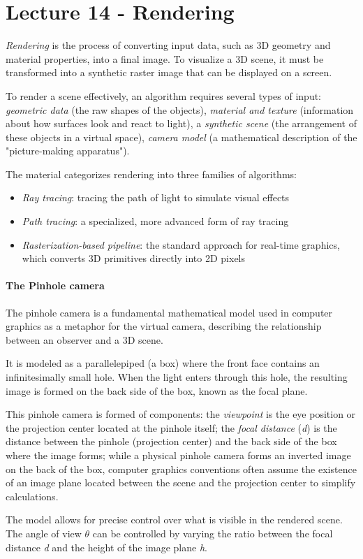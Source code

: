 \chapter{Lecture 14 - Rendering}
\begin{definition}[Rendering]
    \emph{Rendering} is the process of converting input data, such as 3D geometry and material properties, into a final image. To visualize a 3D scene, it must be transformed into a synthetic raster image that can be displayed on a screen.
\end{definition}

To render a scene effectively, an algorithm requires several types of input: \textit{geometric data} (the raw shapes of the objects), \textit{material and texture} (information about how surfaces look and react to light), a \textit{synthetic scene} (the arrangement of these objects in a virtual space), \textit{camera model} (a mathematical description of the "picture-making apparatus").\par
The material categorizes rendering into three families of algorithms:
\begin{itemize}[noitemsep]
    \item \textit{Ray tracing}: tracing the path of light to simulate visual effects
    \item \textit{Path tracing}: a specialized, more advanced form of ray tracing
    \item \textit{Rasterization-based pipeline}: the standard approach for real-time graphics, which converts 3D primitives directly into 2D pixels
\end{itemize}

\subsubsection{The Pinhole camera}
The pinhole camera is a fundamental mathematical model used in computer graphics as a metaphor for the virtual camera, describing the relationship between an observer and a 3D scene.\par
It is modeled as a parallelepiped (a box) where the front face contains an infinitesimally small hole. When the light enters through this hole, the resulting image is formed on the back side of the box, known as the focal plane. \par
This pinhole camera is formed of components: the \textit{viewpoint} is the eye position or the projection center located at the pinhole itself; the \textit{focal distance} (\textit{d}) is the distance between the pinhole (projection center) and the back side of the box where the image forms; while a physical pinhole camera forms an inverted image on the back of the box, computer graphics conventions often assume the existence of an image plane located between the scene and the projection center to simplify calculations.\par
The model allows for precise control over what is visible in the rendered scene. The angle of view \(\theta\) can be controlled by varying the ratio between the focal distance \textit{d} and the height of the image plane \textit{h}.

